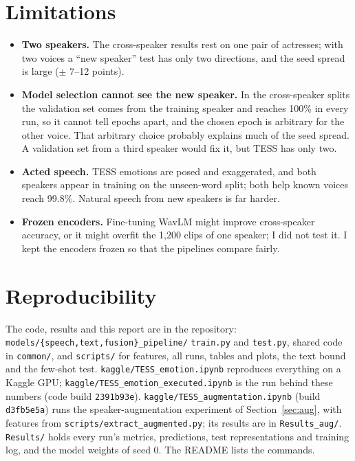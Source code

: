 \documentclass[11pt,a4paper]{article}
\newcommand{\code}[1]{\texttt{#1}}
\begin{document}
\section{Limitations}
\begin{itemize}
\item \textbf{Two speakers.} The cross-speaker results rest on one pair of actresses; with two voices a
``new speaker'' test has only two directions, and the seed spread is large ($\pm$ 7--12 points).
\item \textbf{Model selection cannot see the new speaker.} In the cross-speaker splits the validation set comes
from the training speaker and reaches 100\% in every run, so it cannot tell epochs apart, and the chosen epoch is
arbitrary for the other voice. That arbitrary choice probably explains much of the seed spread. A validation set
from a third speaker would fix it, but TESS has only two.
\item \textbf{Acted speech.} TESS emotions are posed and exaggerated, and both speakers appear in training on the
unseen-word split; both help known voices reach 99.8\%. Natural speech from new speakers is far harder.
\item \textbf{Frozen encoders.} Fine-tuning WavLM might improve cross-speaker accuracy, or it might overfit the 1,200
clips of one speaker; I did not test it. I kept the encoders frozen so that the pipelines compare fairly.
\end{itemize}

\section{Reproducibility}
The code, results and this report are in the repository: \code{models/\{speech,text,fusion\}\_pipeline/}
\code{train.py} and \code{test.py}, shared code in \code{common/}, and \code{scripts/} for features, all runs,
tables and plots, the text bound and the few-shot test. \code{kaggle/TESS\_emotion.ipynb} reproduces everything on
a Kaggle GPU; \code{kaggle/TESS\_emotion\_executed.ipynb} is the run behind these numbers (code build
\code{2391b93e}). \code{kaggle/TESS\_augmentation.ipynb} (build \code{d3fb5e5a}) runs the speaker-augmentation
experiment of Section~\ref{sec:aug}, with features from \code{scripts/extract\_augmented.py}; its results are in
\code{Results\_aug/}.
\code{Results/} holds every run's metrics, predictions, test representations and training log, and the model
weights of seed 0. The README lists the commands.
\end{document}
